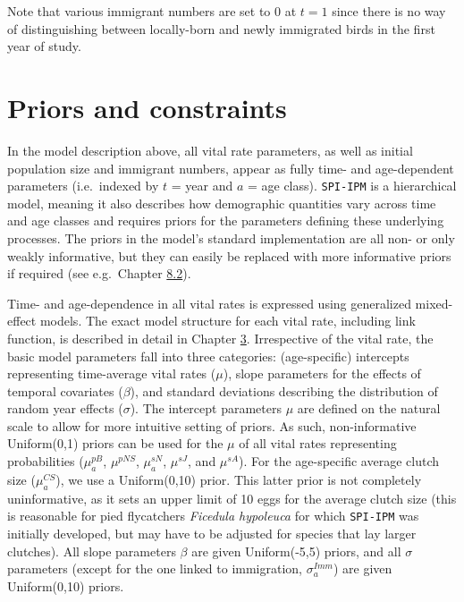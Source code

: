 \documentclass[
]{book}
\begin{document}
Note that various immigrant numbers are set to 0 at \(t=1\) since there is no way of distinguishing between locally-born and newly immigrated birds in the first year of study.

\hypertarget{priors-and-constraints}{%
\section{Priors and constraints}\label{priors-and-constraints}}

In the model description above, all vital rate parameters, as well as initial
population size and immigrant numbers, appear as fully time- and age-dependent
parameters (i.e.~indexed by \(t\) = year and \(a\) = age class). \texttt{SPI-IPM} is a
hierarchical model, meaning it also describes how demographic quantities vary
across time and age classes and requires priors for the parameters defining
these underlying processes. The priors in the model's standard implementation
are all non- or only weakly informative, but they can easily be replaced with
more informative priors if required (see e.g.~Chapter \protect\hyperlink{ux5cux23ux5cux2520Includingux5cux2520additionalux5cux2520dataux5cux2520andux5cux2520informativeux5cux2520priors}{8.2}).

Time- and age-dependence in all vital rates is expressed using generalized
mixed-effect models. The exact model structure for each vital rate,
including link function, is described in detail in Chapter \protect\hyperlink{ux5cux2520Modellingux5cux2520temporalux5cux2520variation}{3}. Irrespective of the vital rate, the basic model parameters fall into
three categories: (age-specific) intercepts representing time-average vital
rates (\(\mu\)), slope parameters for the effects of temporal covariates (\(\beta\)),
and standard deviations describing the distribution of random year effects
(\(\sigma\)).
The intercept parameters \(\mu\) are defined on the natural scale to allow for
more intuitive setting of priors. As such, non-informative Uniform(0,1) priors
can be used for the \(\mu\) of all vital rates representing probabilities
(\(\mu_a^{pB}\), \(\mu^{pNS}\), \(\mu_a^{sN}\), \(\mu^{sJ}\), and \(\mu^{sA}\)). For the
age-specific average clutch size (\(\mu_a^{CS}\)), we use a Uniform(0,10) prior.
This latter prior is not completely uninformative, as it sets an upper limit of
10 eggs for the average clutch size (this is reasonable for pied flycatchers
\textit{Ficedula hypoleuca} for which \texttt{SPI-IPM} was initially developed, but
may have to be adjusted for species that lay larger clutches).
All slope parameters \(\beta\) are given Uniform(-5,5) priors, and all \(\sigma\)
parameters (except for the one linked to immigration, \(\sigma_a^{Imm}\)) are
given Uniform(0,10) priors.
\end{document}
